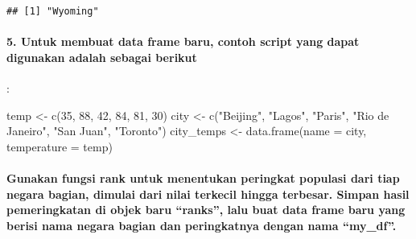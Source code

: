 \documentclass[
]{article}
\newenvironment{Shaded}{\begin{snugshade}}{\end{snugshade}}
\newcommand{\AttributeTok}[1]{\textcolor[rgb]{0.77,0.63,0.00}{#1}}
\newcommand{\DecValTok}[1]{\textcolor[rgb]{0.00,0.00,0.81}{#1}}
\newcommand{\FunctionTok}[1]{\textcolor[rgb]{0.00,0.00,0.00}{#1}}
\newcommand{\NormalTok}[1]{#1}
\newcommand{\OtherTok}[1]{\textcolor[rgb]{0.56,0.35,0.01}{#1}}
\newcommand{\StringTok}[1]{\textcolor[rgb]{0.31,0.60,0.02}{#1}}
\begin{document}
\begin{verbatim}
## [1] "Wyoming"
\end{verbatim}

\hypertarget{untuk-membuat-data-frame-baru-contoh-script-yang-dapat-digunakan-adalah-sebagai-berikut}{%
\paragraph{5. Untuk membuat data frame baru, contoh script yang dapat
digunakan adalah sebagai
berikut}\label{untuk-membuat-data-frame-baru-contoh-script-yang-dapat-digunakan-adalah-sebagai-berikut}}

:

\begin{Shaded}
\begin{Highlighting}[]
\NormalTok{temp }\OtherTok{\textless{}{-}} \FunctionTok{c}\NormalTok{(}\DecValTok{35}\NormalTok{, }\DecValTok{88}\NormalTok{, }\DecValTok{42}\NormalTok{, }\DecValTok{84}\NormalTok{, }\DecValTok{81}\NormalTok{, }\DecValTok{30}\NormalTok{) }
\NormalTok{city }\OtherTok{\textless{}{-}} \FunctionTok{c}\NormalTok{(}\StringTok{"Beijing"}\NormalTok{, }\StringTok{"Lagos"}\NormalTok{, }\StringTok{"Paris"}\NormalTok{, }\StringTok{"Rio de Janeiro"}\NormalTok{, }
\StringTok{"San Juan"}\NormalTok{, }\StringTok{"Toronto"}\NormalTok{) }
\NormalTok{city\_temps }\OtherTok{\textless{}{-}} \FunctionTok{data.frame}\NormalTok{(}\AttributeTok{name =}\NormalTok{ city, }\AttributeTok{temperature =}\NormalTok{ temp) }
\end{Highlighting}
\end{Shaded}

\hypertarget{gunakan-fungsi-rank-untuk-menentukan-peringkat-populasi-dari-tiap-negara-bagian-dimulai-dari-nilai-terkecil-hingga-terbesar.-simpan-hasil-pemeringkatan-di-objek-baru-ranks-lalu-buat-data-frame-baru-yang-berisi-nama-negara-bagian-dan-peringkatnya-dengan-nama-my_df.}{%
\paragraph{Gunakan fungsi rank untuk menentukan peringkat populasi dari
tiap negara bagian, dimulai dari nilai terkecil hingga terbesar. Simpan
hasil pemeringkatan di objek baru ``ranks'', lalu buat data frame baru
yang berisi nama negara bagian dan peringkatnya dengan nama
``my\_df''.}\label{gunakan-fungsi-rank-untuk-menentukan-peringkat-populasi-dari-tiap-negara-bagian-dimulai-dari-nilai-terkecil-hingga-terbesar.-simpan-hasil-pemeringkatan-di-objek-baru-ranks-lalu-buat-data-frame-baru-yang-berisi-nama-negara-bagian-dan-peringkatnya-dengan-nama-my_df.}}
\end{document}
